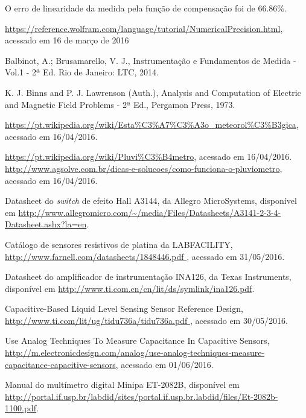 \documentclass[a4paper]{instrumentacao}
\begin{document}
O erro de linearidade da medida pela função de compensação foi de 66.86\%.

\newpage
\begin{thebibliography}{9}
 \url{https://reference.wolfram.com/language/tutorial/NumericalPrecision.html}, acessado em 16 de março de 2016

  Balbinot, A.; Brusamarello, V. J., Instrumentação e Fundamentos de Medida - Vol.1 - 2ª Ed. Rio de Janeiro: LTC, 2014.

 K. J. Binns and P. J. Lawrenson (Auth.), Analysis and Computation of Electric and Magnetic Field Problems - 2ª Ed., Pergamon Press, 1973.

 \url{https://pt.wikipedia.org/wiki/Esta\%C3\%A7\%C3\%A3o_meteorol\%C3\%B3gica}, acessado em 16/04/2016.

 \url{https://pt.wikipedia.org/wiki/Pluvi\%C3\%B4metro}, acessado em 16/04/2016.
 \url{http://www.agsolve.com.br/dicas-e-solucoes/como-funciona-o-pluviometro}, acessado em 16/04/2016.

 Datasheet do \textit{switch} de efeito Hall A3144, da Allegro MicroSystems, disponível em \url{http://www.allegromicro.com/~/media/Files/Datasheets/A3141-2-3-4-Datasheet.ashx?la=en}.

 Catálogo de sensores resistivos de platina da LABFACILITY, \url{http://www.farnell.com/datasheets/1848446.pdf }, acessado em 31/05/2016.

 Datasheet do amplificador de instrumentação INA126, da Texas Instruments, disponível em \url{http://www.ti.com.cn/cn/lit/ds/symlink/ina126.pdf}.

 Capacitive-Based Liquid Level Sensing Sensor Reference Design, \url{http://www.ti.com/lit/ug/tidu736a/tidu736a.pdf
}, acessado em 30/05/2016.

 Use Analog Techniques To Measure Capacitance In Capacitive Sensors, \url{http://m.electronicdesign.com/analog/use-analog-techniques-measure-capacitance-capacitive-sensors}, acessado em 01/06/2016.

 Manual do multímetro digital Minipa ET-2082B, disponível em \url{http://portal.if.usp.br/labdid/sites/portal.if.usp.br.labdid/files/Et-2082b-1100.pdf}.



\end{thebibliography}
\end{document}
